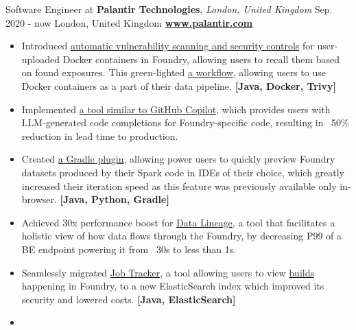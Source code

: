 \cveventflat
{Software Engineer at }
{\textbf{Palantir Technologies}, \textit{London, United Kingdom}}
{Sep. 2020 - now}
{London, United Kingdom}
\newline
\href{https://www.palantir.com/}{\textbf{www.palantir.com}}
\begin{itemize}
    \item {
        Introduced
        \href{https://www.palantir.com/docs/foundry/administration/container-governance/}{automatic vulnerability scanning and security controls}
        for user-uploaded Docker containers in Foundry, allowing users to recall them based on found exposures.
        This green-lighted
        \href{https://www.palantir.com/docs/foundry/transforms-python/container-overview/}{a workflow},
        allowing users to use Docker containers as a part of their data pipeline.
    }
    \newline
    \textbf{[Java, Docker, Trivy]}
    \item {
        Implemented
        \href{https://www.palantir.com/docs/foundry/code-repositories/aip-features/#code-autocomplete}{a tool similar to GitHub Copilot},
        which provides users with LLM-generated code completions for Foundry-specific code, resulting in ~50\% reduction in lead time to production.
    }
    \item {
        Created
        \href{https://www.palantir.com/docs/foundry/transforms-common/local-preview/}{a Gradle plugin},
        allowing power users to quickly preview Foundry datasets produced by their Spark code in IDEs of their
        choice, which greatly increased their iteration speed as this feature was previously available only in-browser.
    }
    \textbf{[Java, Python, Gradle]}
    \item {
        Achieved 30x performance boost for
        \href{https://www.palantir.com/docs/foundry/data-lineage/overview/}{Data Lineage},
        a tool that facilitates a holistic view of how data flows through the Foundry,
        by decreasing P99 of a BE endpoint powering it from ~30s to less than 1s.
    }
    \item {
        Seamlessly migrated
        \href{https://www.palantir.com/docs/foundry/data-integration/application-reference/#builds}{Job Tracker},
        a tool allowing users to view
        \href{https://www.palantir.com/docs/foundry/data-integration/builds/}{builds}
        happening in Foundry, to a new ElasticSearch index which improved its security and lowered costs.
    }
    \textbf{[Java, ElasticSearch]}
    \item {
}
\end{itemize}
